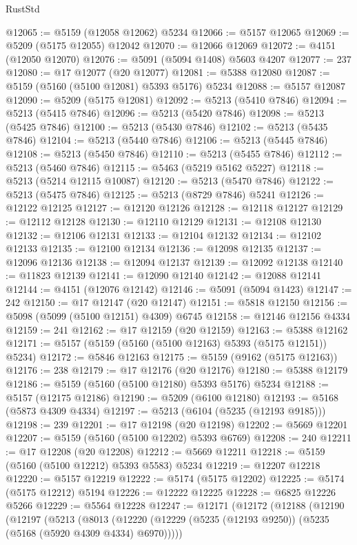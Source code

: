 \begin{lexlean}{RustStd}
\begin{coremodule}
@12065 := @5159 (@12058 @12062) @5234
@12066 := @5157 @12065
@12069 := @5209 (@5175 @12055) @12042
@12070 := @12066 @12069
@12072 := @4151 (@12050 @12070)
@12076 := @5091 (@5094 @1408) @5603 @4207
@12077 := 237
@12080 := @17 @12077 (@20 @12077)
@12081 := @5388 @12080
@12087 := @5159 (@5160 (@5100 @12081) @5393 @5176) @5234
@12088 := @5157 @12087
@12090 := @5209 (@5175 @12081)
@12092 := @5213 (@5410 @7846)
@12094 := @5213 (@5415 @7846)
@12096 := @5213 (@5420 @7846)
@12098 := @5213 (@5425 @7846)
@12100 := @5213 (@5430 @7846)
@12102 := @5213 (@5435 @7846)
@12104 := @5213 (@5440 @7846)
@12106 := @5213 (@5445 @7846)
@12108 := @5213 (@5450 @7846)
@12110 := @5213 (@5455 @7846)
@12112 := @5213 (@5460 @7846)
@12115 := @5463 (@5219 @5162 @5227)
@12118 := @5213 (@5214 @12115 @10087)
@12120 := @5213 (@5470 @7846)
@12122 := @5213 (@5475 @7846)
@12125 := @5213 (@8729 @7846) @5241
@12126 := @12122 @12125
@12127 := @12120 @12126
@12128 := @12118 @12127
@12129 := @12112 @12128
@12130 := @12110 @12129
@12131 := @12108 @12130
@12132 := @12106 @12131
@12133 := @12104 @12132
@12134 := @12102 @12133
@12135 := @12100 @12134
@12136 := @12098 @12135
@12137 := @12096 @12136
@12138 := @12094 @12137
@12139 := @12092 @12138
@12140 := @11823 @12139
@12141 := @12090 @12140
@12142 := @12088 @12141
@12144 := @4151 (@12076 @12142)
@12146 := @5091 (@5094 @1423)
@12147 := 242
@12150 := @17 @12147 (@20 @12147)
@12151 := @5818 @12150
@12156 := @5098 (@5099 (@5100 @12151) @4309) @6745
@12158 := @12146 @12156 @4334
@12159 := 241
@12162 := @17 @12159 (@20 @12159)
@12163 := @5388 @12162
@12171 := @5157 (@5159 (@5160 (@5100 @12163) @5393 (@5175 @12151)) @5234)
@12172 := @5846 @12163
@12175 := @5159 (@9162 (@5175 @12163))
@12176 := 238
@12179 := @17 @12176 (@20 @12176)
@12180 := @5388 @12179
@12186 := @5159 (@5160 (@5100 @12180) @5393 @5176) @5234
@12188 := @5157 (@12175 @12186)
@12190 := @5209 (@6100 @12180)
@12193 := @5168 (@5873 @4309 @4334)
@12197 := @5213 (@6104 (@5235 (@12193 @9185)))
@12198 := 239
@12201 := @17 @12198 (@20 @12198)
@12202 := @5669 @12201
@12207 := @5159 (@5160 (@5100 @12202) @5393 @6769)
@12208 := 240
@12211 := @17 @12208 (@20 @12208)
@12212 := @5669 @12211
@12218 := @5159 (@5160 (@5100 @12212) @5393 @5583) @5234
@12219 := @12207 @12218
@12220 := @5157 @12219
@12222 := @5174 (@5175 @12202)
@12225 := @5174 (@5175 @12212) @5194
@12226 := @12222 @12225
@12228 := @6825 @12226 @5266
@12229 := @5564 @12228
@12247 := @12171
    (@12172
      (@12188
        (@12190
          (@12197
            (@5213
              (@8013
                (@12220 (@12229 (@5235 (@12193 @9250)) (@5235 (@5168 (@5920 @4309 @4334) @6970)))))

\end{coremodule}
\end{lexlean}
